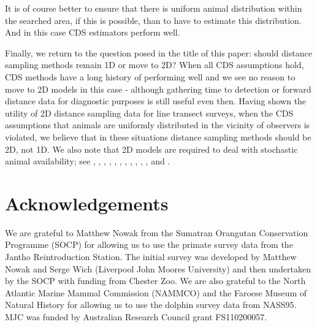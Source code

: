 \documentclass[useAMS,usenatbib,referee]{biom}
\begin{document}
It is of course better to ensure that there is uniform animal distribution within the searched area, if this is possible, than to have to estimate this distribution. And in this case CDS estimators perform well.

Finally, we return to the question posed in the title of this paper: should distance sampling methods remain 1D or move to 2D? When all CDS assumptions hold, CDS methods have a long history of performing well and we see no reason to move to 2D models in this case - although gathering time to detection or forward distance data for diagnostic purposes is still useful even then. Having shown the utility of 2D distance sampling data for line transect surveys, when the CDS assumptions that animals are uniformly distributed in the vicinity of observers is violated, we believe that in these situations distance sampling methods should be 2D, not 1D. We also note that 2D models are required to deal with stochastic animal availability; see \citep{Schweder:90}, \cite{Schweder+al:96}, \cite{Schweder+al:97}, \cite{Schweder+al:99}, \cite{Skaug+Schweder:99}, \cite{Okamura:03}, \cite{Skaug+al:04}, \cite{Okamura+al:03}, \cite{Okamura+al:06}, \cite{Okamura+al:12}, \cite{Borchers+al:13}, \cite{Langrock+al:13} and  \cite{Borchers+Langrock:ip}.

\section*{Acknowledgements}
We are grateful to Matthew Nowak from the Sumatran Orangutan Conservation Programme (SOCP) for allowing us to use the primate survey data from the Jantho Reintroduction Station. The initial survey was developed by Matthew Nowak and Serge Wich (Liverpool John Moores University) and then undertaken by the SOCP with funding from Chester Zoo. We are also grateful to the North Atlantic Marine Mammal Commission (NAMMCO) and the Faroese Museum of Natural History for allowing us to use the dolphin survey data from NASS95. MJC was funded by Australian Research Council grant FS110200057.


\label{lastpage}



\end{document}
